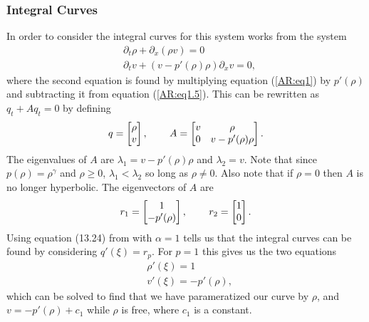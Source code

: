 \documentclass{article}
\begin{document}
\subsubsection{Integral Curves}
In order to consider the integral curves for this system \cite{AwRascle2000} 
works from the system
\begin{align*}
&\partial_t \rho + \partial_x (\rho v) = 0 \\ 
&\partial_t v + \left(v - p'(\rho)\rho\right)\partial_x v = 0,
\end{align*}
where the second equation is found by multiplying equation (\ref{AR:eq1}) 
by $p'(\rho)$ and subtracting it from equation (\ref{AR:eq1.5}). 
This can be rewritten as $q_t + Aq_t = 0$ by defining
\begin{align*}
q = \left[ \begin{matrix}
\rho \\ v
\end{matrix}\right] , \hspace{0.3in}
A = \left[ \begin{matrix}
v & \rho \\
0 & v - p'(\rho ) \rho
\end{matrix}\right].
\end{align*}
The eigenvalues of $A$ are $\lambda_1 = v - p'(\rho ) \rho$ and 
$\lambda_2 = v$. Note that since $p(\rho ) = \rho^{\gamma}$ 
and $\rho \geq 0$, $\lambda_1 < \lambda_2$ so long as $\rho \neq 0$. 
Also note that if $\rho = 0$ then $A$ is no longer 
hyperbolic. The eigenvectors of $A$ are
\begin{align*}
r_1 = \left[ \begin{matrix}
1 \\ - p'(\rho )
\end{matrix}\right], \hspace{0.3in}
r_2 = \left[ \begin{matrix}
1 \\ 0
\end{matrix}\right].
\end{align*}
Using equation (13.24) from \cite{LeVeque2002} with $\alpha = 1$ tells us 
that the integral curves can be found by considering $q'(\xi ) = r_p$. 
For $p = 1$ this gives us the two equations
\begin{align*}
&\rho'(\xi ) = 1 \\
&v'(\xi ) = - p'(\rho ),
\end{align*}
which can be solved to find that we have parameratized our curve by $\rho$, 
and $v = - p'(\rho ) + c_1$ while $\rho$ is free, where $c_1$ is a constant. 
\end{document}
